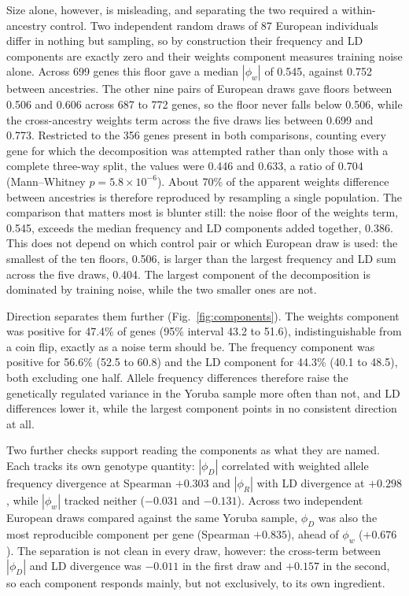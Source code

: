 \documentclass[conference]{IEEEtran}
\begin{document}
Size alone, however, is misleading, and separating the two required a within-ancestry control. Two independent random draws of 87 European individuals differ in nothing but sampling, so by construction their frequency and LD components are exactly zero and their weights component measures training noise alone. Across 699 genes this floor gave a median $|\phi_w|$ of 0.545, against 0.752 between ancestries. The other nine pairs of European draws gave floors between 0.506 and 0.606 across 687 to 772 genes, so the floor never falls below 0.506, while the cross-ancestry weights term across the five draws lies between 0.699 and 0.773. Restricted to the 356 genes present in both comparisons, counting every gene for which the decomposition was attempted rather than only those with a complete three-way split, the values were 0.446 and 0.633, a ratio of 0.704 (Mann--Whitney $p = 5.8 \times 10^{-6}$). About 70\% of the apparent weights difference between ancestries is therefore reproduced by resampling a single population. The comparison that matters most is blunter still: the noise floor of the weights term, 0.545, exceeds the median frequency and LD components added together, 0.386. This does not depend on which control pair or which European draw is used: the smallest of the ten floors, 0.506, is larger than the largest frequency and LD sum across the five draws, 0.404. The largest component of the decomposition is dominated by training noise, while the two smaller ones are not.

Direction separates them further (Fig.~\ref{fig:components}). The weights component was positive for 47.4\% of genes (95\% interval 43.2 to 51.6), indistinguishable from a coin flip, exactly as a noise term should be. The frequency component was positive for 56.6\% (52.5 to 60.8) and the LD component for 44.3\% (40.1 to 48.5), both excluding one half. Allele frequency differences therefore raise the genetically regulated variance in the Yoruba sample more often than not, and LD differences lower it, while the largest component points in no consistent direction at all.

Two further checks support reading the components as what they are named. Each tracks its own genotype quantity: $|\phi_D|$ correlated with weighted allele frequency divergence at Spearman $+0.303$ and $|\phi_R|$ with LD divergence at $+0.298$, while $|\phi_w|$ tracked neither ($-0.031$ and $-0.131$). Across two independent European draws compared against the same Yoruba sample, $\phi_D$ was also the most reproducible component per gene (Spearman $+0.835$), ahead of $\phi_w$ ($+0.676$). The separation is not clean in every draw, however: the cross-term between $|\phi_D|$ and LD divergence was $-0.011$ in the first draw and $+0.157$ in the second, so each component responds mainly, but not exclusively, to its own ingredient.
\end{document}
